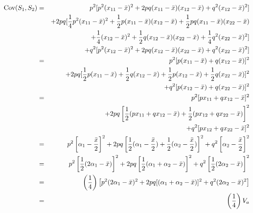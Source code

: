 \documentclass[12pt]{article}
\begin{document}
\begin{eqnarray*}
\mbox{Cov}(S_1,S_2) &=& p^2[p^2(x_{11} - {\bar x})^2 + 2pq(x_{11} - {\bar x})
                                                (x_{12} - {\bar x})
                                           + q^2(x_{12} - {\bar x})^2] \\
             &&+ 2pq[{1 \over 4}p^2(x_{11} - {\bar x})^2
                  + {1 \over 2}p(x_{11} - {\bar x})(x_{12} - {\bar x})
                  + {1 \over 2}pq(x_{11} - {\bar x})(x_{22} - {\bar x}) \\
             &&\ \ + {1 \over 4}(x_{12} - {\bar x})^2
                  + {1 \over 2}q(x_{12} - {\bar x})(x_{22} - {\bar x})
                  + {1 \over 4}q^2(x_{22} - {\bar x})^2] \\
             &&+ q^2[p^2(x_{12} - {\bar x})^2 + 2pq(x_{12} - {\bar
                x})(x_{22} - {\bar x})
                                                 + q^2(x_{22} - {\bar
                                                x})^2] \\
   &=&\ p^2[p(x_{11} - {\bar x}) + q(x_{12} - {\bar x})]^2 \\
   &&+ 2pq[{1 \over 2}p(x_{11} - {\bar x}) +
         {1 \over 2}q(x_{12} - {\bar x}) +
         {1 \over 2}p(x_{12} - {\bar x}) +
         {1 \over 2}q(x_{22} - {\bar x})]^2 \\
   &&+ q^2[p(x_{12} - {\bar x}) + q(x_{22} - {\bar x})]^2 \\
   &=&\ p^2[px_{11} + qx_{12} - {\bar x}]^2 \\
   &&+ 2pq\left[{1 \over 2}(px_{11} + qx_{12} - {\bar x}) +
         {1 \over 2}(px_{12} + qx_{22} - {\bar x})\right]^2 \\
   &&+ q^2[px_{12} + qx_{22} - {\bar x}]^2 \\
   &=&\ p^2\left[\alpha_1 - {{\bar x} \over 2}\right]^2
   + 2pq\left[{1 \over 2}(\alpha_1 - {{\bar x} \over 2}) +
         {1 \over 2}(\alpha_2 - {{\bar x} \over 2})\right]^2
   + q^2\left[\alpha_2 - {{\bar x} \over 2}\right]^2 \\
   &=&\ p^2\left[{1 \over 2}(2\alpha_1 - {\bar x})\right]^2
   + 2pq\left[{1 \over 2}(\alpha_1 + \alpha_2 - {\bar x})\right]^2
        + q^2\left[{1 \over 2}(2\alpha_2 - {\bar x})\right]^2 \\
   &=& \left({1 \over 4}\right)
      \left[p^2(2\alpha_1 - {\bar x})^2
        + 2pq[(\alpha_1+\alpha_2 - {\bar x})]^2
        + q^2(2\alpha_2 - {\bar x})^2\right] \\
   &=& \left({1 \over 4}\right)V_a
\end{eqnarray*}
\end{document}
